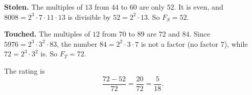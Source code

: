 \textbf{Stolen.} The multiples of $13$ from $44$ to $60$ are only $52$. It is even, and $8008=2^3\cdot7\cdot11\cdot13$ is divisible by $52=2^2\cdot13$. So $F_S=52$.

\textbf{Touched.} The multiples of $12$ from $70$ to $89$ are $72$ and $84$. Since $5976=2^3\cdot3^2\cdot83$, the number $84=2^2\cdot3\cdot7$ is not a factor (no factor $7$), while $72=2^3\cdot3^2$ is. So $F_T=72$.

The rating is
\[\dfrac{72-52}{72}=\dfrac{20}{72}=\boxed{\dfrac{5}{18}}.\]
